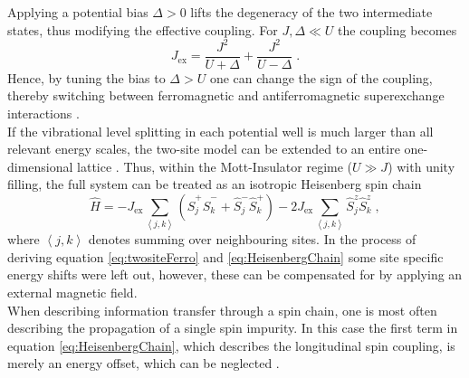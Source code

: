 Applying a potential bias $\Delta > 0$ lifts the degeneracy of the two intermediate states, thus modifying the effective coupling. For $J,\Delta \ll U$ the coupling becomes
\begin{equation}
	J_{\mathrm{ex}} = \frac{J^2}{U + \Delta} + \frac{J^2}{U - \Delta} \; . \label{eq:Jex_delta}
\end{equation}
Hence, by tuning the bias to $\Delta > U$ one can change the sign of the coupling, thereby switching between ferromagnetic and antiferromagnetic superexchange interactions \cite{Trotzky2008}.\\
If the vibrational level splitting in each potential well is much larger than all relevant energy scales, the two-site model can be extended to an entire one-dimensional lattice \cite{Trotzky2008}. Thus, within the Mott-Insulator regime ($U \gg J$) with unity filling, the full system can be treated as an isotropic Heisenberg spin chain
\begin{equation}
	\hat{H} = - J_{\mathrm{ex}} \sum_{\left\langle j, k \right\rangle} \left( \hat{S}_{j}^{+} \hat{S}_{k}^{-} + \hat{S}_{j}^{-} \hat{S}_{k}^{+} \right) - 2 J_{\mathrm{ex}} \sum_{\left\langle j, k \right\rangle} \hat{S}_{j}^{z} \hat{S}_{k}^{z} \; , \label{eq:HeisenbergChain}
\end{equation}
where $\left\langle j, k \right\rangle$ denotes summing over neighbouring sites. In the process of deriving equation \eqref{eq:twositeFerro} and \eqref{eq:HeisenbergChain} some site specific energy shifts were left out, however, these can be compensated for by applying an external magnetic field.\\
When describing information transfer through a spin chain, one is most often describing the propagation of a single spin impurity. In this case the first term in equation \ref{eq:HeisenbergChain}, which describes the longitudinal spin coupling, is merely an energy offset, which can be neglected \cite{Fukuhara2013}.  